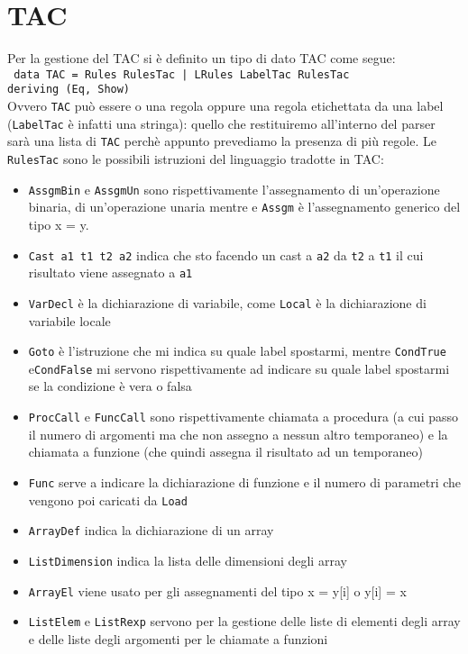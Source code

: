 \documentclass{article}
\begin{document}
\section{TAC}
Per la gestione del TAC si è definito un tipo di dato \textsc{TAC} come segue:\\
\texttt{
data TAC = Rules RulesTac | LRules LabelTac RulesTac\\
\indent deriving (Eq, Show)
}\\ Ovvero \texttt{TAC} può essere o una regola oppure una regola etichettata da una label (\texttt{LabelTac} è infatti una stringa): quello che restituiremo all'interno del parser sarà una lista di \texttt{TAC} perchè appunto prevediamo la presenza di più regole. Le \texttt{RulesTac} sono le possibili istruzioni del linguaggio tradotte in TAC:
\begin{itemize}
    \item \texttt{AssgmBin} e \texttt{AssgmUn} sono rispettivamente l'assegnamento di un'operazione binaria, di un'operazione unaria mentre  e \texttt{Assgm} è l'assegnamento generico del tipo x = y.
    \item \texttt{Cast a1 t1 t2 a2} indica che sto facendo un cast a \texttt{a2} da \texttt{t2} a \texttt{t1} il cui risultato viene assegnato a \texttt{a1}
    \item \texttt{VarDecl} è la dichiarazione di variabile, come \texttt{Local} è la dichiarazione di variabile locale
    \item \texttt{Goto} è l'istruzione che mi indica su quale label spostarmi, mentre \texttt{CondTrue} e\texttt{CondFalse} mi servono rispettivamente ad indicare su quale label spostarmi se la condizione è vera o falsa
    \item \texttt{ProcCall} e \texttt{FuncCall} sono rispettivamente chiamata a procedura (a cui passo il numero di argomenti ma che non assegno a nessun altro temporaneo) e la chiamata a funzione (che quindi assegna il risultato ad un temporaneo)
    \item \texttt{Func} serve a indicare la dichiarazione di funzione e il numero di parametri che vengono poi caricati da \texttt{Load}
    \item \texttt{ArrayDef} indica la dichiarazione di un array
    \item \texttt{ListDimension} indica la lista delle dimensioni degli array
    \item \texttt{ArrayEl} viene usato per gli assegnamenti del tipo  x = y[i] o y[i] = x
    \item \texttt{ListElem} e \texttt{ListRexp} servono per la gestione delle liste di elementi degli array e delle liste degli argomenti per le chiamate a funzioni

\end{itemize}
\end{document}
